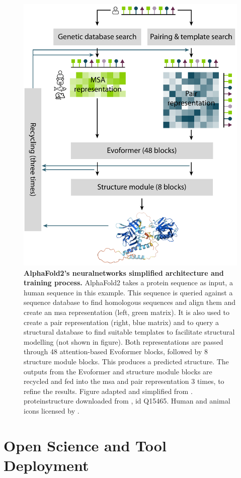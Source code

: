 \begin{figure}[H]
    \centering
    \includegraphics[width=0.75\linewidth]{figures/af2_architecture_simple.pdf}
    \caption{\textbf{AlphaFold2's \gls{neuralnetworks} simplified architecture and training process.} AlphaFold2 takes a protein sequence as input, a human sequence in this example. This sequence is queried against a sequence database to find homologous sequences and align them and create an \gls{msa} representation (left, green matrix). It is also used to create a pair representation (right, blue matrix) and to query a structural database to find suitable templates to facilitate structural modelling (not shown in figure). Both representations are passed through 48 \gls{attention}-based Evoformer blocks, followed by 8 structure module blocks. This produces a predicted structure. The outputs from the Evoformer and structure module blocks are recycled and fed into the \gls{msa} and pair representation 3 times, to refine the results. Figure adapted and simplified from \cite{jumper_highly_2021}. \gls{proteinstructure} downloaded from , id Q15465. Human and animal icons licensed by .}
    \label{fig:chapter1:af2_structure}
\end{figure}



\section{Open Science and Tool Deployment}

